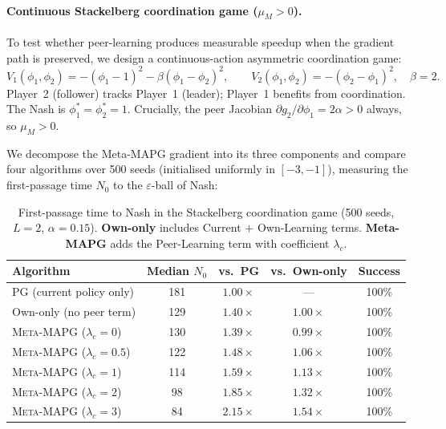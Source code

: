 \documentclass[11pt,a4paper]{article}
\newcommand{\MAPG}{\textsc{Meta-MAPG}}
\theoremstyle{remark}
\begin{document}
\paragraph{Continuous Stackelberg coordination game ($\mu_M > 0$).}
To test whether peer-learning produces measurable speedup when the gradient path is preserved, we design a continuous-action asymmetric coordination game:
\[
  V_1(\phi_1,\phi_2) = -(\phi_1 - 1)^2 - \beta(\phi_1 - \phi_2)^2, \qquad
  V_2(\phi_1,\phi_2) = -(\phi_2 - \phi_1)^2, \quad \beta=2.
\]
Player~2 (follower) tracks Player~1 (leader); Player~1 benefits from coordination. The Nash is $\phi_1^* = \phi_2^* = 1$. Crucially, the peer Jacobian $\partial g_2 / \partial \phi_1 = 2\alpha > 0$ always, so $\mu_M > 0$.

We decompose the Meta-MAPG gradient into its three components and compare four algorithms over 500 seeds (initialised uniformly in $[-3, -1]$), measuring the first-passage time $N_0$ to the $\varepsilon$-ball of Nash:

\begin{table}[H]
  \centering
  \caption{First-passage time to Nash in the Stackelberg coordination game (500 seeds, $L=2$, $\alpha=0.15$). \textbf{Own-only} includes Current $+$ Own-Learning terms. \textbf{Meta-MAPG} adds the Peer-Learning term with coefficient $\lambda_c$.}
  \label{tab:stackelberg}
  \setlength{\tabcolsep}{6pt}
  \begin{tabular}{lcccc}
    \toprule
    \textbf{Algorithm} & \textbf{Median $N_0$} & \textbf{vs.\ PG} & \textbf{vs.\ Own-only} & \textbf{Success} \\
    \midrule
    PG (current policy only)       & 181 & $1.00\times$ & ---             & 100\% \\
    Own-only (no peer term)        & 129 & $1.40\times$ & $1.00\times$    & 100\% \\
    \MAPG{} ($\lambda_c{=}0$)     & 130 & $1.39\times$ & $0.99\times$    & 100\% \\
    \MAPG{} ($\lambda_c{=}0.5$)   & 122 & $1.48\times$ & $1.06\times$    & 100\% \\
    \MAPG{} ($\lambda_c{=}1$)     & 114 & $1.59\times$ & $\mathbf{1.13\times}$ & 100\% \\
    \MAPG{} ($\lambda_c{=}2$)     &  98 & $1.85\times$ & $\mathbf{1.32\times}$ & 100\% \\
    \MAPG{} ($\lambda_c{=}3$)     &  84 & $2.15\times$ & $\mathbf{1.54\times}$ & 100\% \\
    \bottomrule
  \end{tabular}
\end{table}
\end{document}
